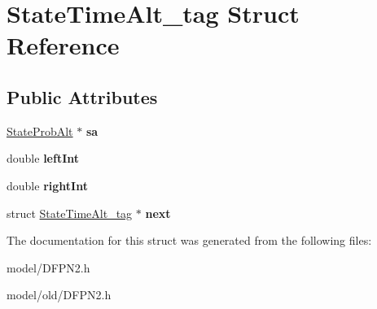 \hypertarget{structStateTimeAlt__tag}{\section{State\-Time\-Alt\-\_\-tag Struct Reference}
\label{structStateTimeAlt__tag}
}
\subsection*{Public Attributes}
\begin{DoxyCompactItemize}
\item 
\hypertarget{structStateTimeAlt__tag_afabf01ad4269fb670274bd948b504ecb}{\hyperlink{structStateProbAlt__tag}{State\-Prob\-Alt} $\ast$ {\bfseries sa}}\label{structStateTimeAlt__tag_afabf01ad4269fb670274bd948b504ecb}

\item 
\hypertarget{structStateTimeAlt__tag_a39cdb5d8628f31980280f1f7c3ead97e}{double {\bfseries left\-Int}}\label{structStateTimeAlt__tag_a39cdb5d8628f31980280f1f7c3ead97e}

\item 
\hypertarget{structStateTimeAlt__tag_a9f2fa05a0dd6c3c17a34da6fb225c4d3}{double {\bfseries right\-Int}}\label{structStateTimeAlt__tag_a9f2fa05a0dd6c3c17a34da6fb225c4d3}

\item 
\hypertarget{structStateTimeAlt__tag_aac6d881131ab8cc209a37f92442631a2}{struct \hyperlink{structStateTimeAlt__tag}{State\-Time\-Alt\-\_\-tag} $\ast$ {\bfseries next}}\label{structStateTimeAlt__tag_aac6d881131ab8cc209a37f92442631a2}

\end{DoxyCompactItemize}


The documentation for this struct was generated from the following files\-:\begin{DoxyCompactItemize}
\item 
model/D\-F\-P\-N2.\-h\item 
model/old/D\-F\-P\-N2.\-h\end{DoxyCompactItemize}
